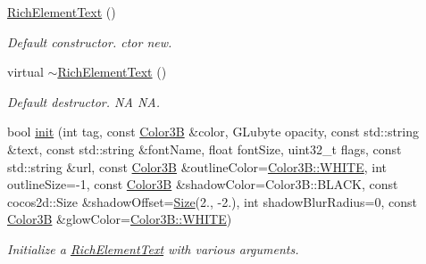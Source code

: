 \begin{DoxyCompactItemize}
\hyperlink{classui_1_1RichElementText_af1893a4f982b5fdc74c8d54726dff8dc}{Rich\+Element\+Text} ()
\begin{DoxyCompactList}\small\item\em Default constructor.  ctor  new. \end{DoxyCompactList}\item 
\mbox{\label{classui_1_1RichElementText_aa42ce1649325a0e8e0ef4ec04337910f}} 
virtual \hyperlink{classui_1_1RichElementText_aa42ce1649325a0e8e0ef4ec04337910f}{$\sim$\+Rich\+Element\+Text} ()
\begin{DoxyCompactList}\small\item\em Default destructor.  NA  NA. \end{DoxyCompactList}\item 
bool \hyperlink{classui_1_1RichElementText_aaa0fca748c6e6b0093724ca8dd0fc824}{init} (int tag, const \hyperlink{structColor3B}{Color3B} \&color, G\+Lubyte opacity, const std\+::string \&text, const std\+::string \&font\+Name, float font\+Size, uint32\+\_\+t flags, const std\+::string \&url, const \hyperlink{structColor3B}{Color3B} \&outline\+Color=\hyperlink{structColor3B_adf57cb86ca15f434b29215ad471cdc35}{Color3\+B\+::\+W\+H\+I\+TE}, int outline\+Size=-\/1, const \hyperlink{structColor3B}{Color3B} \&shadow\+Color=Color3\+B\+::\+B\+L\+A\+CK, const cocos2d\+::\+Size \&shadow\+Offset=\hyperlink{classSize}{Size}(2., -\/2.), int shadow\+Blur\+Radius=0, const \hyperlink{structColor3B}{Color3B} \&glow\+Color=\hyperlink{structColor3B_adf57cb86ca15f434b29215ad471cdc35}{Color3\+B\+::\+W\+H\+I\+TE})
\begin{DoxyCompactList}\small\item\em Initialize a \hyperlink{classui_1_1RichElementText}{Rich\+Element\+Text} with various arguments. \end{DoxyCompactList}\end{DoxyCompactItemize}
